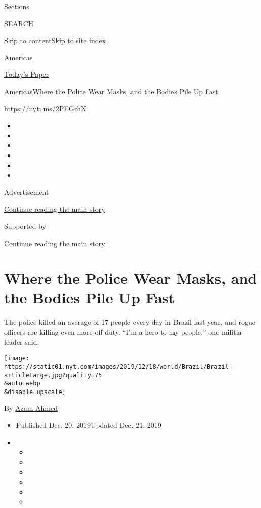 Sections

SEARCH

\protect\hyperlink{site-content}{Skip to
content}\protect\hyperlink{site-index}{Skip to site index}

\href{https://www.nytimes.com/section/world/americas}{Americas}

\href{https://myaccount.nytimes.com/auth/login?response_type=cookie\&client_id=vi}{}

\href{https://www.nytimes.com/section/todayspaper}{Today's Paper}

\href{/section/world/americas}{Americas}\textbar{}Where the Police Wear
Masks, and the Bodies Pile Up Fast

\url{https://nyti.ms/2PEGrhK}

\begin{itemize}
\item
\item
\item
\item
\item
\item
\end{itemize}

Advertisement

\protect\hyperlink{after-top}{Continue reading the main story}

Supported by

\protect\hyperlink{after-sponsor}{Continue reading the main story}

\hypertarget{where-the-police-wear-masks-and-the-bodies-pile-up-fast}{%
\section{Where the Police Wear Masks, and the Bodies Pile Up
Fast}\label{where-the-police-wear-masks-and-the-bodies-pile-up-fast}}

The police killed an average of 17 people every day in Brazil last year,
and rogue officers are killing even more off duty. ``I'm a hero to my
people,'' one militia leader said.

\texttt{[image: https://static01.nyt.com/images/2019/12/18/world/Brazil/Brazil-articleLarge.jpg?quality=75\\\&auto=webp\\\&disable=upscale]}

By \href{https://www.nytimes.com/by/azam-ahmed}{Azam Ahmed}

\begin{itemize}
\item
  Published Dec. 20, 2019Updated Dec. 21, 2019
\item
  \begin{itemize}
  \item
  \item
  \item
  \item
  \item
  \item
  \end{itemize}
\end{itemize}


